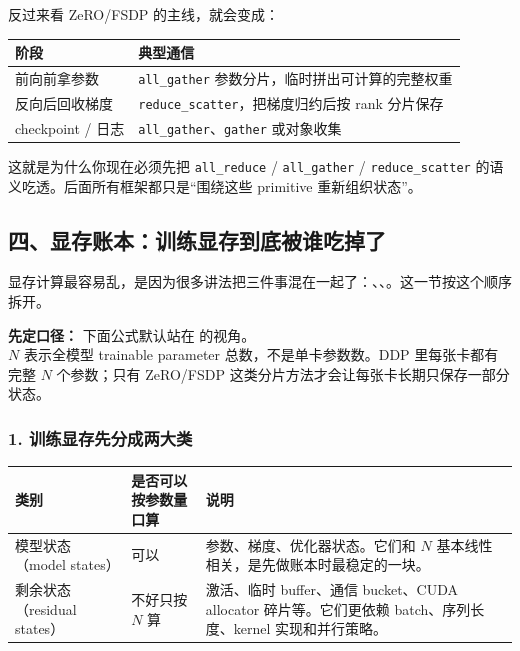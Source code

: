 反过来看 ZeRO/FSDP 的主线，就会变成：

\begin{center}
{\small
\begin{tabular}{p{3.1cm}p{9.5cm}}
\hline
\textbf{阶段} & \textbf{典型通信} \\
\hline
前向前拿参数 & \texttt{all\_gather} 参数分片，临时拼出可计算的完整权重 \\
反向后回收梯度 & \texttt{reduce\_scatter}，把梯度归约后按 rank 分片保存 \\
checkpoint / 日志 & \texttt{all\_gather}、\texttt{gather} 或对象收集 \\
\hline
\end{tabular}
}
\end{center}

这就是为什么你现在必须先把 \texttt{all\_reduce} / \texttt{all\_gather} / \texttt{reduce\_scatter} 的语义吃透。后面所有框架都只是“围绕这些 primitive 重新组织状态”。

\subsection{四、显存账本：训练显存到底被谁吃掉了}

显存计算最容易乱，是因为很多讲法把三件事混在一起了：、、。这一节按这个顺序拆开。

\begin{conceptbox}
\textbf{先定口径：} 下面公式默认站在 的视角。\\
$N$ 表示全模型 trainable parameter 总数，不是单卡参数数。DDP 里每张卡都有完整 $N$ 个参数；只有 ZeRO/FSDP 这类分片方法才会让每张卡长期只保存一部分状态。
\end{conceptbox}

\subsubsection*{1. 训练显存先分成两大类}

\begin{center}
{\small
\begin{tabular}{p{3.4cm}p{4.1cm}p{5.4cm}}
\hline
\textbf{类别} & \textbf{是否可以按参数量口算} & \textbf{说明} \\
\hline
模型状态（model states） & 可以 & 参数、梯度、优化器状态。它们和 $N$ 基本线性相关，是先做账本时最稳定的一块。 \\
剩余状态（residual states） & 不好只按 $N$ 算 & 激活、临时 buffer、通信 bucket、CUDA allocator 碎片等。它们更依赖 batch、序列长度、kernel 实现和并行策略。 \\
\hline
\end{tabular}
}
\end{center}

